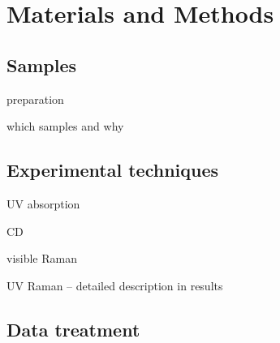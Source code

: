 \chapter{Materials and Methods}

\section{Samples}

\begin{docitemize}
	\item preparation
	\item which samples and why
\end{docitemize}

\section{Experimental techniques}

\begin{docitemize}
	\item UV absorption
	\item CD
	\item visible Raman
	\item UV Raman -- detailed description in results
\end{docitemize}

\section{Data treatment}
